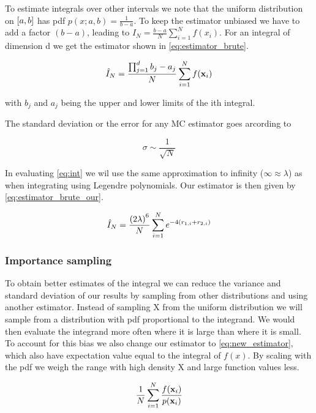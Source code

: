 To estimate integrals over other intervals we note that the uniform
distribution on $\left[a,b\right]$ has pdf $p(x;a,b) = \frac{1}{b-a}$.
To keep the estimator unbiased we have to add a factor $(b-a)$, leading to
$\hat{I}_N = \frac{b-a}{N}\sum_{i=1}^{N}f(x_i)$.
For an integral of dimension d we get the estimator shown in
\cref{eq:estimator_brute}.

\begin{equation}
  \label{eq:estimator_brute}
  \hat{I}_N
  = \frac{\prod_{j=1}^{d} b_j - a_j }{N}\sum_{i=1}^{N} f(\mathbf{x}_i)
\end{equation}

with $b_j$ and $a_j$ being the upper and lower limits of the ith integral.

The standard deviation or the error for any MC estimator goes arcording to 

\begin{equation}\label{eq: std}
  \sigma \sim \frac{1}{\sqrt{N}}
\end{equation}


In evaluating \cref{eq:int} we wil use the same approximation to infinity
($\infty \approx \lambda$) as when integrating using Legendre polynomials. Our
estimator is then given by \cref{eq:estimator_brute_our}.

\begin{equation}
  \label{eq:estimator_brute_our}
  \hat{I}_N
  = \frac{\left(2\lambda\right)^6}{N} \sum_{i=1}^{N} e^{-4(r_{1,i} + r_{2,i})}
\end{equation}



\subsubsection{Importance sampling}

To obtain better estimates of the integral we can reduce the variance and
standard deviation of our results by sampling from other distributions and using
another estimator. Instead of sampling X from the uniform distribution we will
sample from a distribution with pdf proportional to the integrand. We would then
evaluate the integrand more often where it is large than where it is small. To
account for this bias we also change our estimator to \cref{eq:new_estimator},
which also have expectation value equal to the integral of $f(x)$.
By scaling with the pdf we weigh the range with high density X and large
function values less.

\begin{equation}
  \label{eq:new_estimator}
  \frac{1}{N} \sum_{i=1}^{N} \frac{f(\mathbf{x}_i)}{p(\mathbf{x}_i)}
\end{equation}


